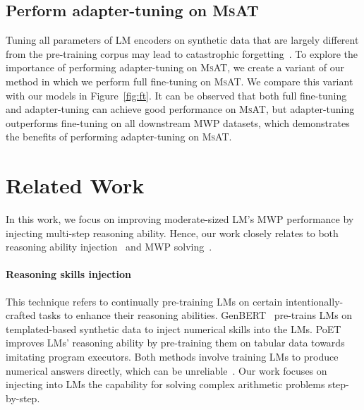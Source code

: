 \documentclass[11pt]{article}
\begin{document}
    

    \subsection{Perform adapter-tuning on \textsc{MsAT}}

      Tuning all parameters of LM encoders on synthetic data that are largely different from the pre-training corpus may lead to catastrophic forgetting~\cite{geva2020genbert}.
To explore the importance of performing adapter-tuning on \textsc{MsAT}, 
        we create a variant of our method in which we perform full fine-tuning on \textsc{MsAT}.
We compare this variant with our models in Figure~\ref{fig:ft}.
It can be observed that both full fine-tuning and adapter-tuning can achieve good performance on \textsc{MsAT},
       but adapter-tuning outperforms fine-tuning on all downstream MWP datasets, 
        which demonstrates the benefits of performing adapter-tuning on \textsc{MsAT}.
    


\section{Related Work}

  In this work, we focus on improving moderate-sized LM's MWP performance by injecting multi-step reasoning ability.
Hence, our work closely relates to both reasoning ability injection~\cite{geva2020genbert,pi2022poet}
    and MWP solving~\cite{xie2019treedecoder,patel2021svamp,jie2022deductreason}.

  
  \paragraph{Reasoning skills injection}
This technique refers to continually pre-training LMs on certain intentionally-crafted tasks to enhance their reasoning abilities.
GenBERT~\cite{geva2020genbert} pre-trains LMs on templated-based synthetic data to inject numerical skills into the LMs.
PoET~\cite{pi2022poet} improves LMs' reasoning ability by pre-training them on tabular data towards imitating program executors.
Both methods involve training LMs to produce numerical answers directly, which can be unreliable~\cite{razeghi2022impact}.
Our work focuses on injecting into LMs the capability for solving complex arithmetic problems step-by-step.

  
  \vspace{+7pt}
\end{document}
